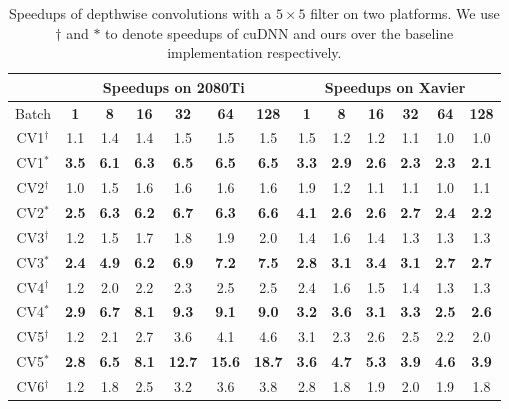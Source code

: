 \begin{table}[]
\setlength{\tabcolsep}{3.8pt}
\caption{Speedups of depthwise convolutions with a $5 \times 5$ filter on two platforms. We use ${\dag}$ and ${*}$ to denote speedups of cuDNN and ours over the baseline implementation respectively.}
\label{tab:dwconvf5}
\begin{threeparttable}
\begin{tabular}{c|cccccc|cccccc}
\toprule
&\multicolumn{6}{c|}{Speedups on 2080Ti} & \multicolumn{6}{c}{Speedups on Xavier}\\

\midrule
Batch& \textbf{1} & \textbf{8} & \textbf{16}& \textbf{32} & \textbf{64} & \textbf{128} & \textbf{1} & \textbf{8} & \textbf{16}& \textbf{32} & \textbf{64} & \textbf{128}\\
\hline
CV1$^{\dag}$&1.1 &1.4 &1.4 &1.5 &1.5 &1.5 &1.5 &1.2 &1.2 &1.1 &1.0 &1.0 \\
CV1$^{*}$&\textbf{3.5} &\textbf{6.1} &\textbf{6.3} &\textbf{6.5} &\textbf{6.5} &\textbf{6.5} &\textbf{3.3} &\textbf{2.9} &\textbf{2.6} &\textbf{2.3} &\textbf{2.3} &\textbf{2.1} \\
\hline
CV2$^{\dag}$&1.0 &1.5 &1.6 &1.6 &1.6 &1.6 &1.9 &1.2 &1.1 &1.1 &1.0 &1.1 \\
CV2$^{*}$&\textbf{2.5} &\textbf{6.3} &\textbf{6.2} &\textbf{6.7} &\textbf{6.3} &\textbf{6.6} &\textbf{4.1} &\textbf{2.6} &\textbf{2.6} &\textbf{2.7} &\textbf{2.4} &\textbf{2.2} \\
\hline
CV3$^{\dag}$&1.2 &1.5 &1.7 &1.8 &1.9 &2.0 &1.4 &1.6 &1.4 &1.3 &1.3 &1.3 \\
CV3$^{*}$&\textbf{2.4} &\textbf{4.9} &\textbf{6.2} &\textbf{6.9} &\textbf{7.2} &\textbf{7.5} &\textbf{2.8} &\textbf{3.1} &\textbf{3.4} &\textbf{3.1} &\textbf{2.7} &\textbf{2.7} \\
\hline
CV4$^{\dag}$&1.2 &2.0 &2.2 &2.3 &2.5 &2.5 &2.4 &1.6 &1.5 &1.4 &1.3 &1.3 \\
CV4$^{*}$&\textbf{2.9} &\textbf{6.7} &\textbf{8.1} &\textbf{9.3} &\textbf{9.1} &\textbf{9.0} &\textbf{3.2} &\textbf{3.6} &\textbf{3.1} &\textbf{3.3} &\textbf{2.5} &\textbf{2.6} \\
\hline
CV5$^{\dag}$&1.2 &2.1 &2.7 &3.6 &4.1 &4.6 &3.1 &2.3 &2.6 &2.5 &2.2 &2.0 \\
CV5$^{*}$&\textbf{2.8} &\textbf{6.5} &\textbf{8.1} &\textbf{12.7} &\textbf{15.6} &\textbf{18.7} &\textbf{3.6} &\textbf{4.7} &\textbf{5.3} &\textbf{3.9} &\textbf{4.6} &\textbf{3.9} \\
\hline
CV6$^{\dag}$&1.2 &1.8 &2.5 &3.2 &3.6 &3.8 &2.8 &1.8 &1.9 &2.0 &1.9 &1.8 \\

\end{tabular}
\end{threeparttable}
\end{table}
